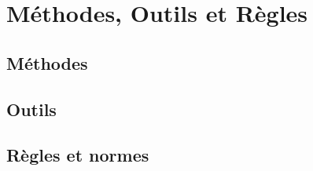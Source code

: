 \section{Méthodes, Outils et Règles}

\subsection{Méthodes}

\subsection{Outils}

\subsection{Règles et normes}
\pagebreak
